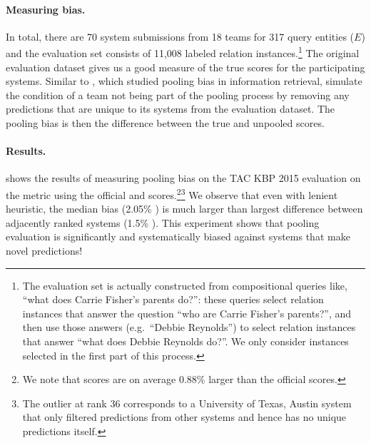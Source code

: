 \paragraph{Measuring bias.}
In total, there are 70 system submissions from 18 teams for 317 query entities ($E$) and the evaluation set consists of 11,008 labeled relation instances.\footnote{%
  The evaluation set is actually constructed from compositional queries like, ``what does Carrie Fisher's parents do?'':
  these queries select relation instances that answer the question ``who are Carrie Fisher's parents?'', and then use those answers (e.g.\ ``Debbie Reynolds'') to select relation instances that answer ``what does Debbie Reynolds do?''.
  We only consider instances selected in the first part of this process.
}
The original evaluation dataset gives us a good measure of the true scores for the participating systems.
Similar to \citet{zobel1998reliable}, which studied pooling bias in information retrieval,
simulate the condition of a team not being part of the pooling process by removing any predictions that are unique to its systems from the evaluation dataset.
The pooling bias is then the difference between the true and unpooled scores.

\paragraph{Results.}
 shows the results of measuring pooling bias on the TAC KBP 2015 evaluation on the \fone{} metric using the official and \anydoc{} scores.\footnote{%
  We note that \anydoc{} scores are on average 0.88\%\fone{} larger than the official scores. 
  }\footnote{
  The outlier at rank 36 corresponds to a University of Texas, Austin system that only filtered predictions from other systems and hence has no unique predictions itself.
  }
We observe that even with lenient \anydoc{} heuristic, the median bias (2.05\% \fone{}) is much larger than largest difference between adjacently ranked systems (1.5\% \fone{}).
This experiment shows that pooling evaluation is significantly and systematically biased against systems that make novel predictions!


